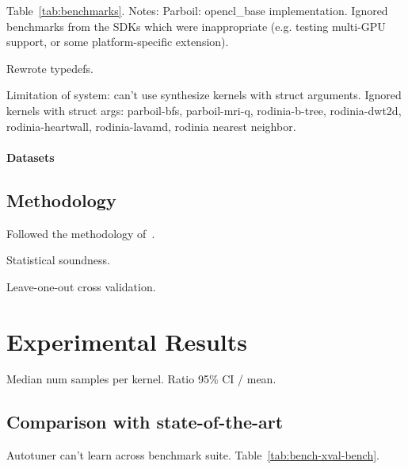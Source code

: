 \documentclass[preprint,nonatbib,10pt,nocopyrightspace]{sigplanconf}
\begin{document}
Table~\ref{tab:benchmarks}. Notes: Parboil: opencl\_base
implementation. Ignored benchmarks from the SDKs which were
inappropriate (e.g. testing multi-GPU support, or some
platform-specific extension).

Rewrote typedefs.

Limitation of system: can't use synthesize kernels with struct
arguments. Ignored kernels with struct args: %
parboil-bfs, %
parboil-mri-q, %
rodinia-b-tree, %
rodinia-dwt2d, %
rodinia-heartwall, %
rodinia-lavamd, %
rodinia nearest neighbor.


\paragraph{Datasets}


\subsection{Methodology}

Followed the methodology of~\cite{Grewe2013}.

Statistical soundness.

Leave-one-out cross validation.


\section{Experimental Results}\label{sec:evaluation}

Median num samples per kernel. Ratio 95\% CI / mean.

\subsection{Comparison with state-of-the-art}

Autotuner can't learn across benchmark
suite. Table~\ref{tab:bench-xval-bench}.
\end{document}
